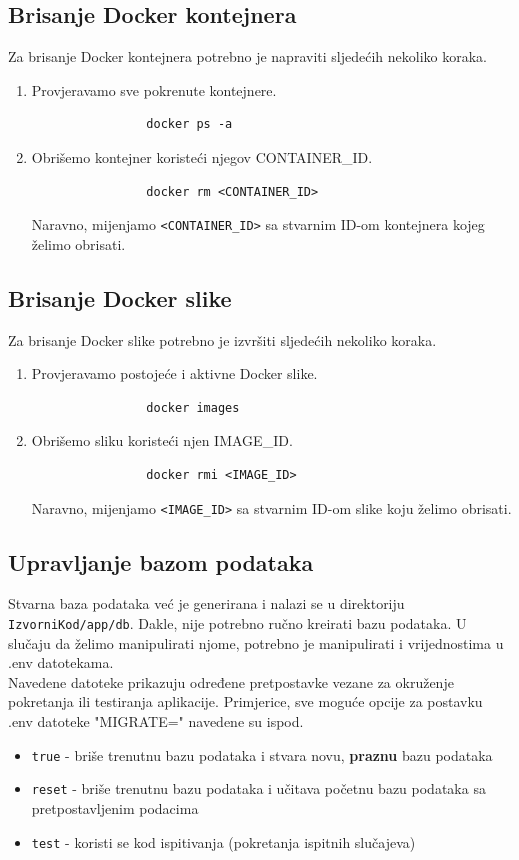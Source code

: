 		\subsection*{Brisanje Docker kontejnera}
		Za brisanje Docker kontejnera potrebno je napraviti sljedećih nekoliko koraka.
		\begin{enumerate}
			\item Provjeravamo sve pokrenute kontejnere.
			\begin{verbatim}
				docker ps -a
			\end{verbatim}
			\item Obrišemo kontejner koristeći njegov CONTAINER\_ID.
			\begin{verbatim}
				docker rm <CONTAINER_ID>
			\end{verbatim}
			Naravno, mijenjamo \texttt{<CONTAINER\_ID>} sa stvarnim ID-om kontejnera kojeg želimo obrisati.
		\end{enumerate}

		\subsection*{Brisanje Docker slike}
		Za brisanje Docker slike potrebno je izvršiti sljedećih nekoliko koraka.
		\begin{enumerate}
			\item Provjeravamo postojeće i aktivne Docker slike.
			\begin{verbatim}
				docker images
			\end{verbatim}
			\item Obrišemo sliku koristeći njen IMAGE\_ID.
			\begin{verbatim}
				docker rmi <IMAGE_ID>
			\end{verbatim}
			Naravno, mijenjamo \texttt{<IMAGE\_ID>} sa stvarnim ID-om slike koju želimo obrisati.
		\end{enumerate}

		\subsection*{Upravljanje bazom podataka}
			Stvarna baza podataka već  je generirana i nalazi se u direktoriju \texttt{IzvorniKod/app/db}.
			Dakle, nije potrebno ručno kreirati bazu podataka.
			U slučaju da želimo manipulirati njome, potrebno je manipulirati i vrijednostima u .env datotekama.
			\newline
			\\
			Navedene datoteke prikazuju određene pretpostavke vezane za okruženje pokretanja ili testiranja aplikacije. Primjerice, sve moguće opcije za postavku .env datoteke
			"MIGRATE=" navedene su ispod.
			\begin{itemize}
				\item \texttt{true} - briše trenutnu bazu podataka i stvara novu, \textbf{praznu} bazu podataka
				\item \texttt{reset} - briše trenutnu bazu podataka i učitava početnu bazu podataka sa pretpostavljenim podacima
				\item \texttt{test} - koristi se kod ispitivanja (pokretanja ispitnih slučajeva) 
			\end{itemize}
	
